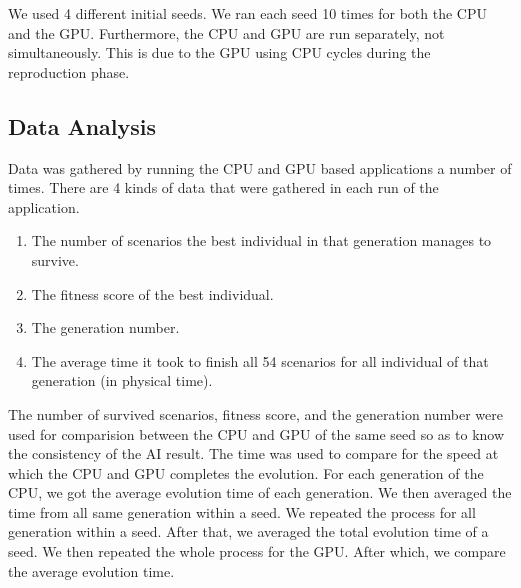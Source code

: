 We used 4 different initial seeds. We ran each seed 10 times for both the CPU and 
the GPU. Furthermore, the CPU and GPU are run separately, not simultaneously. This
is due to the GPU using CPU cycles during the reproduction phase.

\subsection{Data Analysis}
Data was gathered by running the CPU and GPU based applications a number of
times. There are 4 kinds of data that were gathered in each run of the application.

\begin{enumerate}
  \item The number of scenarios the best individual in that generation manages 
to survive.
  \item The fitness score of the best individual.
  \item The generation number.
  \item The average time it took to finish all 54 scenarios for all individual of 
that generation (in physical time).
\end{enumerate}

The number of survived scenarios, fitness score, and the generation number were used for 
comparision between the CPU and GPU of the same seed so as to know the consistency
of the AI result. The time was used to compare for the speed at which the CPU and GPU
completes the evolution. For each generation of the CPU, we got the average evolution
time of each generation. We then averaged the time from all same generation within a seed.
We repeated the process for all generation within a seed. After that, we averaged the 
total evolution time of a seed. We then repeated the whole process for the GPU. After
which, we compare the average evolution time.